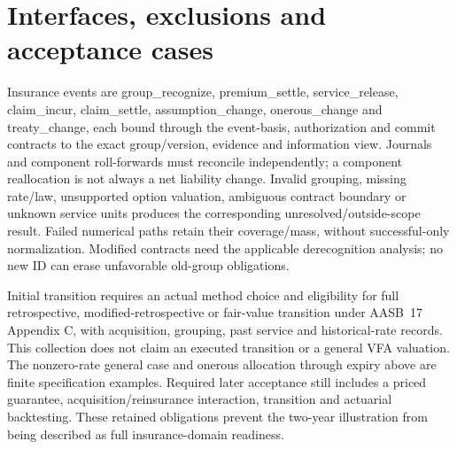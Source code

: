 \clearpage
\hypertarget{interfaces-exclusions-and-acceptance-cases}{%
\section{Interfaces, exclusions and acceptance cases}\label{method-insurance-methods-interfaces-exclusions-and-acceptance-cases}}

Insurance events are group\_recognize, premium\_settle, service\_release, claim\_incur, claim\_settle, assumption\_change, onerous\_change and treaty\_change, each bound through the event-basis, authorization and commit contracts to the exact group/version, evidence and information view. Journals and component roll-forwards must reconcile independently; a component reallocation is not always a net liability change. Invalid grouping, missing rate/law, unsupported option valuation, ambiguous contract boundary or unknown service units produces the corresponding unresolved/outside-scope result. Failed numerical paths retain their coverage/mass, without successful-only normalization. Modified contracts need the applicable derecognition analysis; no new ID can erase unfavorable old-group obligations.

Initial transition requires an actual method choice and eligibility for full retrospective, modified-retrospective or fair-value transition under AASB~17 Appendix C, with acquisition, grouping, past service and historical-rate records. This collection does not claim an executed transition or a general VFA valuation. The nonzero-rate general case and onerous allocation through expiry above are finite specification examples. Required later acceptance still includes a priced guarantee, acquisition/reinsurance interaction, transition and actuarial backtesting. These retained obligations prevent the two-year illustration from being described as full insurance-domain readiness.
